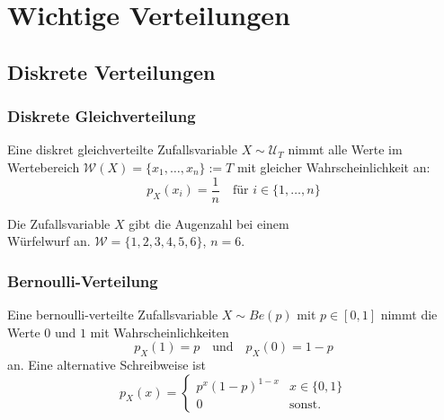 


\section{Wichtige Verteilungen}




\subsection{Diskrete Verteilungen}




\subsubsection{Diskrete Gleichverteilung}

Eine diskret gleichverteilte Zufallsvariable \(X \sim \mathcal{U}_{T}\) nimmt alle Werte im Wertebereich \(\mathcal{W}(X) = \{x_1,\ldots,x_n\} := T\) mit gleicher Wahrscheinlichkeit an:
\[
	p_X(x_i) = \frac{1}{n}
	\quad
	\text{für } i \in \{1,\ldots,n\}
\]

\begin{example}[Würfeln]
	Die Zufallsvariable \(X\) gibt die Augenzahl bei einem \\Würfelwurf an.
	\(\mathcal{W} = \{1,2,3,4,5,6\}\), \(n=6\).
\end{example}




\subsubsection{Bernoulli-Verteilung}

Eine bernoulli-verteilte Zufallsvariable \(X \sim Be(p)\) mit \(p \in [0,1]\) nimmt die Werte \(0\) und \(1\) mit Wahrscheinlichkeiten
\[
	p_X(1) = p
	\quad\text{und}\quad
	p_X(0) = 1-p
\]
an. Eine alternative Schreibweise ist
\[
	p_X(x) =
	\left\{\begin{array}{ll}
		p^x (1-p)^{1-x} & x \in \{0,1\} \\
		0               & \text{sonst}.
	\end{array}\right.
\]

